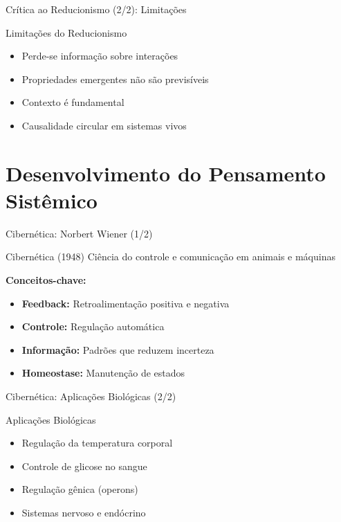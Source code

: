 \begin{frame}{Crítica ao Reducionismo (2/2): Limitações}
\begin{block}{Limitações do Reducionismo}
\begin{itemize}
    \item Perde-se informação sobre interações
    \item Propriedades emergentes não são previsíveis
    \item Contexto é fundamental
    \item Causalidade circular em sistemas vivos
\end{itemize}
\end{block}

\vspace{0.3cm}

\end{frame}

\section{Desenvolvimento do Pensamento Sistêmico}

\begin{frame}{Cibernética: Norbert Wiener (1/2)}
\begin{block}{Cibernética (1948)}
Ciência do controle e comunicação em animais e máquinas

\vspace{0.3cm}

\textbf{Conceitos-chave:}
\begin{itemize}
    \item \textbf{Feedback:} Retroalimentação positiva e negativa
    \item \textbf{Controle:} Regulação automática
    \item \textbf{Informação:} Padrões que reduzem incerteza
    \item \textbf{Homeostase:} Manutenção de estados
\end{itemize}
\end{block}
\end{frame}

\begin{frame}{Cibernética: Aplicações Biológicas (2/2)}
\begin{exampleblock}{Aplicações Biológicas}
\begin{itemize}
    \item Regulação da temperatura corporal
    \item Controle de glicose no sangue
    \item Regulação gênica (operons)
    \item Sistemas nervoso e endócrino
\end{itemize}
\end{exampleblock}
\end{frame}


